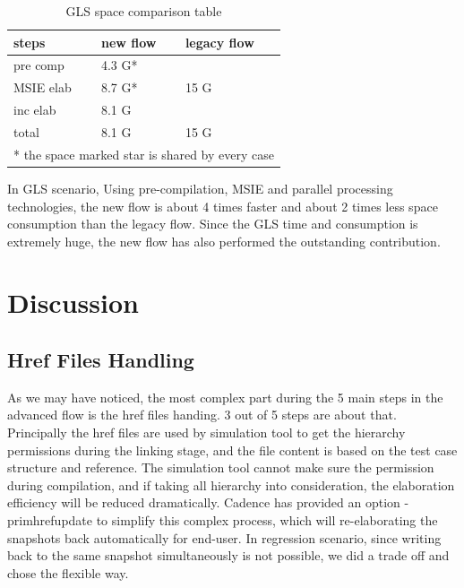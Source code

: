 \documentclass[twoside]{article}
\begin{document}
\begin{multicols}{2}
  \begin{table}[H]
    \caption{GLS space comparison table}
    \centering
    \begin{tabular}{lll}
      \toprule
      \textbf{steps} & \textbf{new flow} & \textbf{legacy flow} \\
      \midrule
      pre comp & 4.3 G* & \multirow{3}{*}{15 G} \\
      \cline{1-2}
      MSIE elab & 8.7 G* & \\
      \cline{1-2}
      inc elab & 8.1 G & \\
      \hline
      total & 8.1 G & 15 G \\
      \bottomrule
      \multicolumn{3}{l}{\footnotesize{* the space marked star is shared by every case}}
    \end{tabular}
    \label{table: gls_space_result}
  \end{table}

  In GLS scenario, Using pre-compilation, MSIE and parallel processing technologies, the new flow is about 4 times faster and about 2 times less space consumption than the legacy flow. Since the GLS time and consumption is extremely huge, the new flow has also performed the outstanding contribution.


  \section{Discussion}

  \subsection{Href Files Handling}

  As we may have noticed, the most complex part during the 5 main steps in the advanced flow is the href files handing. 3 out of 5 steps are about that. Principally the href files are used by simulation tool to get the hierarchy permissions during the linking stage, and the file content is based on the test case structure and reference. The simulation tool cannot make sure the permission during compilation, and if taking all hierarchy into consideration, the elaboration efficiency will be reduced dramatically. Cadence has provided an option -primhrefupdate to simplify this complex process, which will re-elaborating the snapshots back automatically for end-user. In regression scenario, since writing back to the same snapshot simultaneously is not possible, we did a trade off and chose the flexible way.


\end{multicols}
\end{document}
